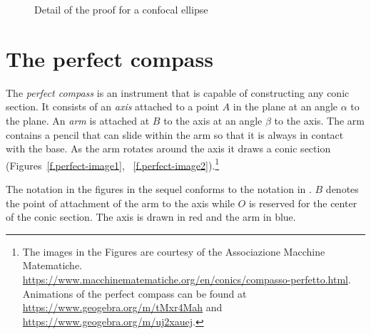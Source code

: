 \begin{figure}
\begin{center}
\caption{Detail of the proof for a confocal ellipse}\label{f.confocal-details}
\end{center}
\end{figure}


\section{The perfect compass}\label{s.perfect}

The \emph{perfect compass} is an instrument that is capable of constructing any conic section. It consists of an \emph{axis} attached to a point $A$ in the plane at an angle $\alpha$ to the plane. An \emph{arm} is attached at $B$ to the axis at an angle $\beta$ to the axis. The arm contains a pencil that can slide within the arm so that it is always in contact with the base. As the arm rotates around the axis it draws a conic section (Figures~\ref{f.perfect-image1}, ~\ref{f.perfect-image2}).\footnote{The images in the Figures are courtesy of the Associazione Macchine Matematiche. \\\hspace*{1.5em} \url{https://www.macchinematematiche.org/en/conics/compasso-perfetto.html}.\\\hspace*{1.5em} Animations of the perfect compass can be found at \url{https://www.geogebra.org/m/tMxr4Mah} and\\\hspace*{1.5em} \url{https://www.geogebra.org/m/uj2xauej}.}

The notation in the figures in the sequel conforms to the notation in \cite{henk}. $B$ denotes the point of attachment of the arm to the axis while $O$ is reserved for the center of the conic section. The axis is drawn in red and the arm in blue.

